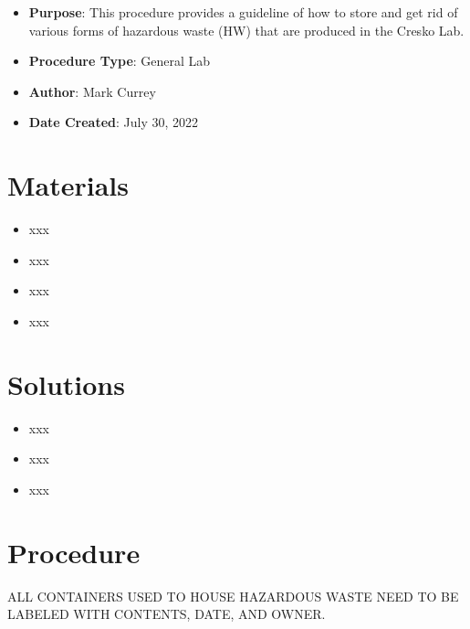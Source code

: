 \documentclass[
  letterpaper,
  DIV=11,
  numbers=noendperiod]{scrreprt}
\providecommand{\tightlist}{%
  \setlength{\itemsep}{0pt}\setlength{\parskip}{0pt}}\usepackage{longtable,booktabs,array}
\begin{document}
\begin{itemize}
\tightlist
\item
  \textbf{Purpose}: This procedure provides a guideline of how to store
  and get rid of various forms of hazardous waste (HW) that are produced
  in the Cresko Lab.
\item
  \textbf{Procedure Type}: General Lab
\item
  \textbf{Author}: Mark Currey
\item
  \textbf{Date Created}: July 30, 2022
\end{itemize}

\hypertarget{materials-3}{%
\section{Materials}\label{materials-3}}

\begin{itemize}
\tightlist
\item
  xxx
\item
  xxx
\item
  xxx
\item
  xxx
\end{itemize}

\hypertarget{solutions-3}{%
\section{Solutions}\label{solutions-3}}

\begin{itemize}
\tightlist
\item
  xxx
\item
  xxx
\item
  xxx
\end{itemize}

\hypertarget{procedure-3}{%
\section{Procedure}\label{procedure-3}}

\begin{tcolorbox}[enhanced jigsaw, rightrule=.15mm, title=\textcolor{quarto-callout-important-color}{\faExclamation}\hspace{0.5em}{IMPORTANT}, titlerule=0mm, opacitybacktitle=0.6, toprule=.15mm, bottomrule=.15mm, opacityback=0, left=2mm, colframe=quarto-callout-important-color-frame, breakable, coltitle=black, colback=white, colbacktitle=quarto-callout-important-color!10!white, bottomtitle=1mm, leftrule=.75mm, toptitle=1mm, arc=.35mm]

ALL CONTAINERS USED TO HOUSE HAZARDOUS WASTE NEED TO BE LABELED WITH
CONTENTS, DATE, AND OWNER.

\end{tcolorbox}
\end{document}
